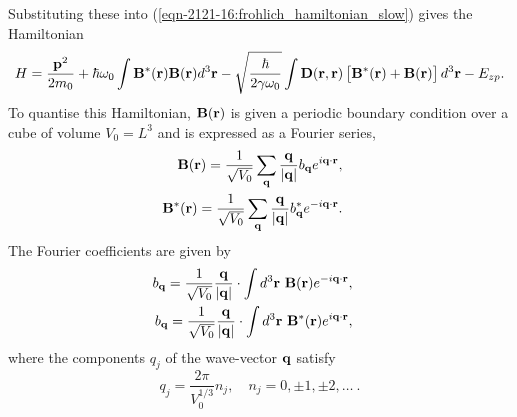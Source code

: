 Substituting these into (\ref{eqn-2121-16:frohlich_hamiltonian_slow}) gives the Hamiltonian
\begin{equation}
\begin{aligned}
    H = \frac{\vb{p}^2}{2m_0} + \hbar \omega_0 \int \vb{B}^*(\vb{r}) \vb{B}(\vb{r}) d^3\vb{r}
    - \sqrt{\frac{\hbar}{2\gamma\omega_0}} \int \vb{D}(\vb{r}, \vb{r}) \left[ \vb{B}^*(\vb{r}) + \vb{B}(\vb{r}) \right] d^3 \vb{r} 
    - E_{zp}.
\end{aligned}
\label{eqn-2122-3}
\end{equation}
To quantise this Hamiltonian, $\vb{B}(\vb{r})$ is given a periodic boundary condition over a cube of volume $V_0 = L^3$ and is expressed as a Fourier series,
\begin{subequations}
\begin{align}
    \begin{split}
        \vb{B}(\vb{r}) &= \frac{1}{\sqrt{V_0}} \sum_{\vb{q}} \frac{\vb{q}}{\abs{\vb{q}}} b_{\vb{q}} e^{i \vb{q} \cdot \vb{r}},
    \end{split}\\
    \begin{split}
        \vb{B}^*(\vb{r}) &= \frac{1}{\sqrt{V_0}} \sum_{\vb{q}} \frac{\vb{q}}{\abs{\vb{q}}} b^*_{\vb{q}} e^{-i \vb{q} \cdot \vb{r}}.
    \end{split}
\end{align}
\label{eqn-2122-4}
\end{subequations}
The Fourier coefficients are given by
\begin{subequations}
\begin{align}
    \begin{split}
        b_{\vb{q}} &= \frac{1}{\sqrt{V_0}} \frac{\vb{q}}{\abs{\vb{q}}} \cdot \int d^3\vb{r}\  \vb{B}(\vb{r}) e^{-i \vb{q} \cdot \vb{r}},
    \end{split}\\
    \begin{split}
        b_{\vb{q}} &= \frac{1}{\sqrt{V_0}} \frac{\vb{q}}{\abs{\vb{q}}} \cdot \int d^3\vb{r}\  \vb{B}^*(\vb{r}) e^{i \vb{q} \cdot \vb{r}},
    \end{split}
\end{align}
\label{eqn-2122-5}
\end{subequations}
where the components $q_j$ of the wave-vector $\vb{q}$ satisfy
\begin{equation}
    q_j = \frac{2\pi}{V_0^{1/3}} n_j, \quad n_j = 0, \pm 1, \pm 2, \dots \ .
\label{eqn-2122-6}
\end{equation}
